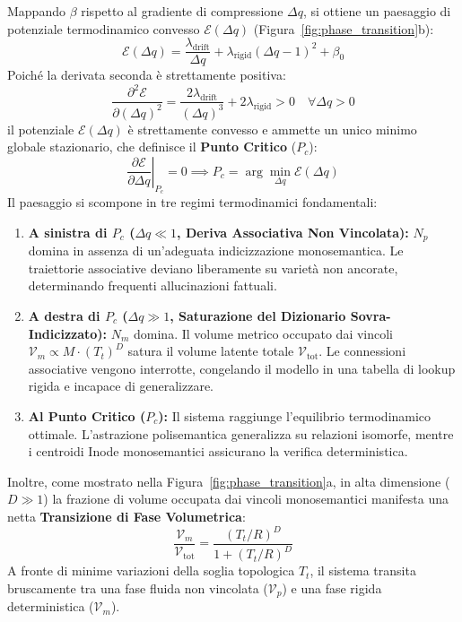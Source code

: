 \documentclass[11pt,a4paper]{article}
\theoremstyle{definition}
\begin{document}
Mappando $\beta$ rispetto al gradiente di compressione $\Delta q$, si ottiene un paesaggio di potenziale termodinamico convesso $\mathcal{E}(\Delta q)$ (Figura~\ref{fig:phase_transition}b):
\begin{equation}
    \mathcal{E}(\Delta q) = \frac{\lambda_{\mathrm{drift}}}{\Delta q} + \lambda_{\mathrm{rigid}} (\Delta q - 1)^2 + \beta_0
    \label{eq:potential_landscape}
\end{equation}
Poiché la derivata seconda è strettamente positiva:
\begin{equation}
    \frac{\partial^2 \mathcal{E}}{\partial (\Delta q)^2} = \frac{2 \lambda_{\mathrm{drift}}}{(\Delta q)^3} + 2 \lambda_{\mathrm{rigid}} > 0 \quad \forall \Delta q > 0
\end{equation}
il potenziale $\mathcal{E}(\Delta q)$ è strettamente convesso e ammette un unico minimo globale stazionario, che definisce il \textbf{Punto Critico} ($P_c$):
\begin{equation}
    \left. \frac{\partial \mathcal{E}}{\partial \Delta q} \right|_{P_c} = 0 \implies P_c = \arg\min_{\Delta q} \mathcal{E}(\Delta q)
\end{equation}
Il paesaggio si scompone in tre regimi termodinamici fondamentali:
\begin{enumerate}[leftmargin=*, itemsep=2.0pt]
    \item \textbf{A sinistra di $P_c$ ($\Delta q \ll 1$, Deriva Associativa Non Vincolata):} $N_p$ domina in assenza di un'adeguata indicizzazione monosemantica. Le traiettorie associative deviano liberamente su varietà non ancorate, determinando frequenti allucinazioni fattuali.
    \item \textbf{A destra di $P_c$ ($\Delta q \gg 1$, Saturazione del Dizionario Sovra-Indicizzato):} $N_m$ domina. Il volume metrico occupato dai vincoli $\mathcal{V}_m \propto M \cdot (T_t)^D$ satura il volume latente totale $\mathcal{V}_{\mathrm{tot}}$. Le connessioni associative vengono interrotte, congelando il modello in una tabella di lookup rigida e incapace di generalizzare.
    \item \textbf{Al Punto Critico ($P_c$):} Il sistema raggiunge l'equilibrio termodinamico ottimale. L'astrazione polisemantica generalizza su relazioni isomorfe, mentre i centroidi Inode monosemantici assicurano la verifica deterministica.
\end{enumerate}

Inoltre, come mostrato nella Figura~\ref{fig:phase_transition}a, in alta dimensione ($D \gg 1$) la frazione di volume occupata dai vincoli monosemantici manifesta una netta \textbf{Transizione di Fase Volumetrica}:
\begin{equation}
    \frac{\mathcal{V}_m}{\mathcal{V}_{\mathrm{tot}}} = \frac{(T_t / R)^D}{1 + (T_t / R)^D}
\end{equation}
A fronte di minime variazioni della soglia topologica $T_t$, il sistema transita bruscamente tra una fase fluida non vincolata ($\mathcal{V}_p$) e una fase rigida deterministica ($\mathcal{V}_m$).
\end{document}

